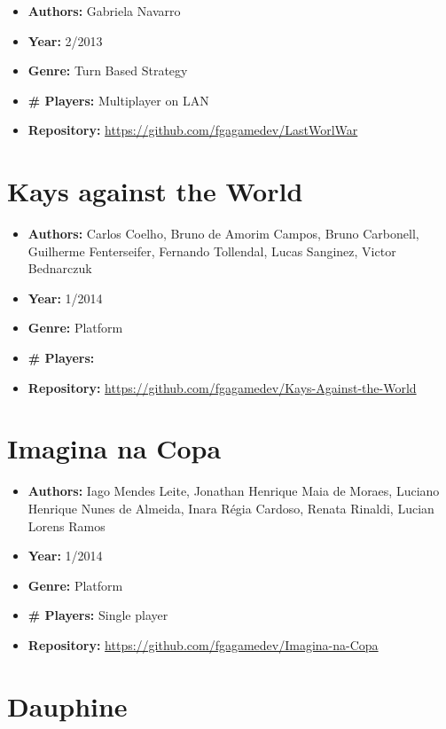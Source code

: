 \begin{apendicesenv}
\begin{itemize}
\item[] \textbf{Authors:} Gabriela Navarro
\item[] \textbf{Year:} 2/2013
\item[] \textbf{Genre:} Turn Based Strategy
\item[] \textbf{\# Players:} Multiplayer on LAN
\item[] \textbf{Repository:} \url{https://github.com/fgagamedev/LastWorlWar}
\end{itemize}


\section{Kays against the World}
\label {sec:kays}


\begin{itemize}
\item[] \textbf{Authors:} Carlos Coelho, Bruno de Amorim Campos, Bruno Carbonell, Guilherme Fenterseifer, Fernando Tollendal, Lucas Sanginez, Victor Bednarczuk
\item[] \textbf{Year:} 1/2014
\item[] \textbf{Genre:} Platform
\item[] \textbf{\# Players:}
\item[] \textbf{Repository:} \url{https://github.com/fgagamedev/Kays-Against-the-World}
\end{itemize}


\section{Imagina na Copa}
\label {sec:imagina}

\begin{itemize}
\item[] \textbf{Authors:} Iago Mendes Leite, Jonathan Henrique Maia de Moraes, Luciano Henrique Nunes de Almeida, Inara Régia Cardoso, Renata Rinaldi, Lucian Lorens Ramos
\item[] \textbf{Year:} 1/2014
\item[] \textbf{Genre:} Platform
\item[] \textbf{\# Players:} Single player
\item[] \textbf{Repository:} \url{https://github.com/fgagamedev/Imagina-na-Copa}
\end{itemize}

\section{Dauphine}
\label {sec:dauphine}


\end{apendicesenv}
